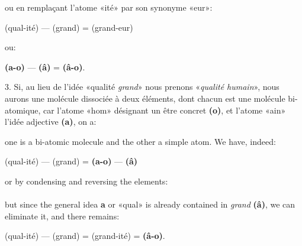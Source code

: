 \begin{sloppypar}
{  \noindent
  ou en remplaçant l’atome «ité» par son synonyme «eur»:

  \begin{center}
    (qual-ité) — (grand) = (grand-eur)
  \end{center}

  \noindent
  ou:

  \begin{center}
    \textbf{(a-o)} — \textbf{(â)} = \textbf{(â-o)}.
  \end{center}


  3. Si, au lieu de l’idée «qualité \emph{grand}» nous prenons
  «\emph{qualité humain}», nous aurons une molécule dissociée à deux
  éléments, dont chacun est une molécule bi-atomique, car l’atome
  «hom» désignant un être concret \textbf{(o)}, et l’atome
  «ain» l'idée adjective \textbf{(a)}, on a:

  \noindent
  {\setlength{\tabcolsep}{2pt}
    }


}
%
{\noindent
  one is a bi-atomic molecule and the other a simple atom. We have,
  indeed:

  \begin{center}
    (qual-ité) — (grand) = \textbf{(a-o)} — \textbf{(â)}
  \end{center}

  \noindent
  or by condensing and reversing the elements:\\[1ex]

  \noindent
  \\[1ex]

  \noindent
  but since the general idea \textbf{a} or «qual» is already contained
  in \emph{grand} \textbf{(â)}, we can eliminate it, and there remains:

  \begin{center}
    (qual-ité) — (grand) = (grand-ité) = \textbf{(â-o)}.
  \end{center}

}
\end{sloppypar}
